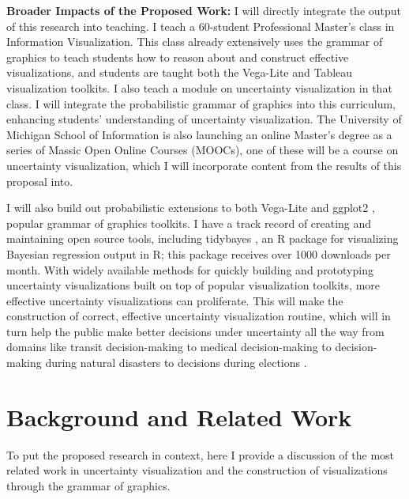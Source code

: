 \documentclass[11pt]{article}
\begin{document}
\noindent \textbf{Broader Impacts of the Proposed Work:} I will directly integrate the output of this research into teaching. I teach a 60-student Professional Master's class in Information Visualization. This class already extensively uses the grammar of graphics to teach students how to reason about and construct effective visualizations, and students are taught both the Vega-Lite \cite{Satyanarayan2017vegalite} and Tableau \cite{mackinlay2007show} visualization toolkits. I also teach a module on uncertainty visualization in that class. I will integrate the probabilistic grammar of graphics into this curriculum, enhancing students' understanding of uncertainty visualization. The University of Michigan School of Information is also launching an online Master's degree as a series of Massic Open Online Courses (MOOCs), one of these will be a course on uncertainty visualization, which I will incorporate content from the results of this proposal into.

I will also build out probabilistic extensions to both Vega-Lite \cite{Satyanarayan2017vegalite} and ggplot2 \cite{wickham2016ggplot2}, popular grammar of graphics toolkits. I have a track record of creating and maintaining open source tools, including tidybayes \cite{kay2017tidybayes}, an R package for visualizing Bayesian regression output in R; this package receives over 1000 downloads per month. With widely available methods for quickly building and prototyping uncertainty visualizations built on top of popular visualization toolkits, more effective uncertainty visualizations can proliferate. This will make the construction of correct, effective uncertainty visualization routine, which will in turn help the public make better decisions under uncertainty all the way from domains like transit decision-making \cite{kay2016bus,Fernandes2018} to medical decision-making \cite{Ancker2006} to decision-making during natural disasters \cite{padilla2017effects, Cox2013hurricane, Mirzargar2014curve_boxplot} to decisions during elections \cite{gregor_aisch_live_2016}.



\section{Background and Related Work}

\noindent To put the proposed research in context, here I provide a discussion of the most related work in uncertainty visualization and the construction of visualizations through the grammar of graphics.
\end{document}
